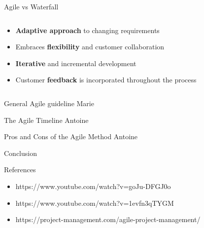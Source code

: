 \documentclass[10pt]{beamer}
\begin{document}
\begin{frame}{Agile vs Waterfall}
  \vspace{2cm}
  \begin{columns}[T]
    \begin{column}{0.5\textwidth}
      \begin{itemize}
        \item<2-> \textbf{Adaptive approach }to changing requirements
        \item<3-> Embraces \textbf{flexibility} and customer collaboration
        \item<4-> \textbf{Iterative} and incremental development
        \item<5-> Customer \textbf{feedback} is incorporated throughout the process
      \end{itemize}
    \end{column}

    \begin{column}{0.5\textwidth}
      
    \end{column}
  \end{columns}
\end{frame}


\begin{frame}{General Agile guideline}
    Marie
\end{frame}

\begin{frame}{The Agile Timeline}
    Antoine
\end{frame}

\begin{frame}{Pros and Cons of the Agile Method}
    Antoine
\end{frame}

\begin{frame}{Conclusion}
  
\end{frame}

\begin{frame}{References}

  \begin{itemize}
    \item https://www.youtube.com/watch?v=goJu-DFGJ0o
    \item https://www.youtube.com/watch?v=1evfn3qTYGM
    \item https://project-management.com/agile-project-management/
  \end{itemize}
  
\end{frame}
\end{document}
